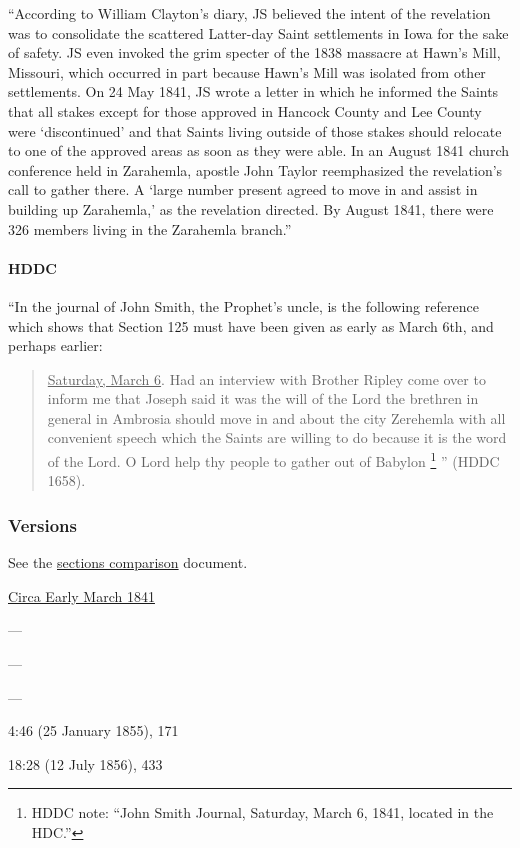 			``According to William Clayton's diary, JS believed the intent of the revelation was to consolidate the scattered Latter-day Saint settlements in Iowa for the sake of safety. JS even invoked the grim specter of the 1838 massacre at Hawn's Mill, Missouri, which occurred in part because Hawn's Mill was isolated from other settlements. On 24 May 1841, JS wrote a letter in which he informed the Saints that all stakes except for those approved in Hancock County and Lee County were `discontinued' and that Saints living outside of those stakes should relocate to one of the approved areas as soon as they were able. In an August 1841 church conference held in Zarahemla, apostle John Taylor reemphasized the revelation's call to gather there. A `large number present agreed to move in and assist in building up Zarahemla,' as the revelation directed. By August 1841, there were 326 members living in the Zarahemla branch.''
			
		\paragraph{HDDC}
		
			``In the journal of John Smith, the Prophet's uncle, is the following reference which shows that Section 125 must have been given as early as March 6th, and perhaps earlier:
			
			\begin{quote}
				\uline{Saturday, March 6}. Had an interview with Brother Ripley come over to inform me that Joseph said it was the will of the Lord the brethren in general in Ambrosia should move in and about the city Zerehemla with all convenient speech which the Saints are willing to do because it is the word of the Lord. O Lord help thy people to gather out of Babylon
					\footnote{%
						HDDC note: ``John Smith Journal, Saturday, March 6, 1841, located in the HDC.''
						}%
				'' (HDDC 1658).
			\end{quote}
					
	\subsubsection{Versions}
		\label{DC125-V}
		
		See the \href{https://drive.google.com/file/d/1goAvNz8jS4R8slYfMG_db55Ty2z_vmgK/view?usp=sharing}{sections comparison} document.
	
		\begin{compactdesc}
			\item[JSP] \hyperref[EMS-1841-JS-MAR-1841]{Circa Early March 1841}
			\item[BC] ---
			\item[DC 1835] ---
			\item[DC 1844] ---
			\item[DN] 4:46 (25 January 1855), 171
			\item[MS] 18:28 (12 July 1856), 433
		\end{compactdesc}

